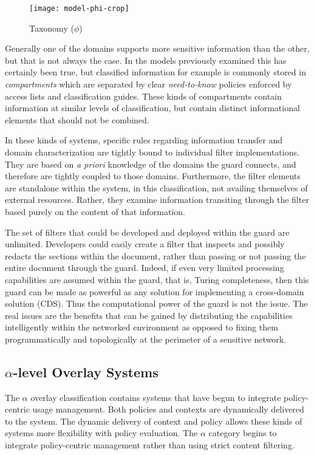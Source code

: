 \begin{figure}[!t]
\centering
\texttt{[image: model-phi-crop]}
\caption{Taxonomy ($\phi$)}
\label{fig:model:taxonomy-phi}
\end{figure}

Generally one of the domains supports more sensitive information than the other, but that is not always the case.  In the models previously examined this has certainly been true, but classified information for example  is commonly stored in \textit{compartments} which are separated by clear \textit{need-to-know} policies enforced by access lists and classification guides.  These kinds of compartments contain information at similar levels of classification, but contain distinct informational elements that should not be combined.

In these kinds of systems, specific rules regarding information transfer and domain characterization are tightly bound to individual filter implementations.  They are based on \textit{a priori} knowledge of the domains the guard connects, and therefore are tightly coupled to those domains.  Furthermore, the filter elements are standalone within the system, in this classification, not availing themselves of external resources.  Rather, they examine information transiting through the filter based purely on the content of that information.

The set of filters that could be developed and deployed within the guard are unlimited.  Developers could easily create a filter that inspects and possibly redacts the sections within the document, rather than passing or not passing the entire document through the guard.  Indeed, if even very limited processing capabilities are assumed within the guard, that is, Turing completeness, then this guard can be made as powerful as any solution for implementing a cross-domain solution (CDS). Thus the computational power of the guard is not the issue. The real issues are the benefits that can be gained by distributing the capabilities intelligently within the networked environment as opposed to fixing them programmatically and topologically at the perimeter of a sensitive network.

\subsection{$\alpha$-level Overlay Systems}
The $\alpha$ overlay classification contains systems that have begun to integrate policy-centric usage management. Both policies and contexts are dynamically delivered to the system. The dynamic delivery of context and policy allows these kinds of systems more flexibility with policy evaluation. The $\alpha$ category begins to integrate policy-centric management rather than using strict content filtering.

